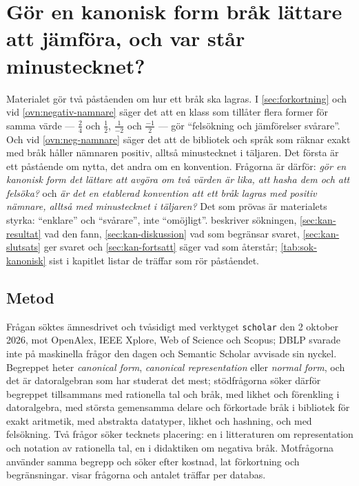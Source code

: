 \chapter{Gör en kanonisk form bråk lättare att jämföra, och var står minustecknet?}
\label{app:kanonisk}

Materialet gör två påståenden om hur ett bråk ska lagras.  I
\cref{sec:forkortning} och vid \cref{ovn:negativ-namnare} säger det att
en klass som tillåter flera former för samma värde --- \(\frac{2}{4}\)
och \(\frac{1}{2}\), \(\frac{1}{-2}\) och \(\frac{-1}{2}\) --- gör
\enquote{felsökning och jämförelser svårare}.
Och vid
\cref{ovn:neg-namnare} säger det att de bibliotek och språk som räknar
exakt med bråk håller nämnaren positiv, alltså minustecknet i
täljaren.  Det första är ett påstående om nytta, det
andra om en konvention.  Frågorna är därför: \emph{gör en kanonisk form
det lättare att avgöra om två värden är lika, att hasha dem och att
felsöka?}  och \emph{är det en etablerad konvention att ett bråk lagras
med positiv nämnare, alltså med minustecknet i täljaren?}  Det som
prövas är materialets styrka: \enquote{enklare} och \enquote{svårare},
inte \enquote{omöjligt}.   beskriver sökningen,
\cref{sec:kan-resultat} vad den fann, \cref{sec:kan-diskussion} vad
som begränsar svaret, \cref{sec:kan-slutsats} ger svaret och
\cref{sec:kan-fortsatt} säger vad som återstår;
\cref{tab:sok-kanonisk} sist i kapitlet listar de träffar som rör
påståendet.

\section{Metod}
\label{sec:kan-metod}

Frågan söktes ämnesdrivet och tvåsidigt med verktyget \texttt{scholar}
den 2 oktober 2026, mot OpenAlex, IEEE Xplore, Web of Science och Scopus;
DBLP svarade inte på maskinella frågor den dagen och Semantic Scholar
avvisade sin nyckel.  Begreppet heter \emph{canonical form},
\emph{canonical representation} eller \emph{normal form}, och det är
datoralgebran som har studerat det mest; stödfrågorna söker därför
begreppet tillsammans med rationella tal och bråk, med likhet och
förenkling i datoralgebra, med största gemensamma delare och förkortade
bråk i bibliotek för exakt aritmetik, med abstrakta datatyper,
likhet och hashning, och med felsökning.  Två frågor söker tecknets placering: en i
litteraturen om representation och notation av rationella tal, en i
didaktiken om negativa bråk.  Motfrågorna använder samma begrepp och
söker efter kostnad, lat förkortning och begränsningar.
 visar frågorna och antalet träffar per
databas.

